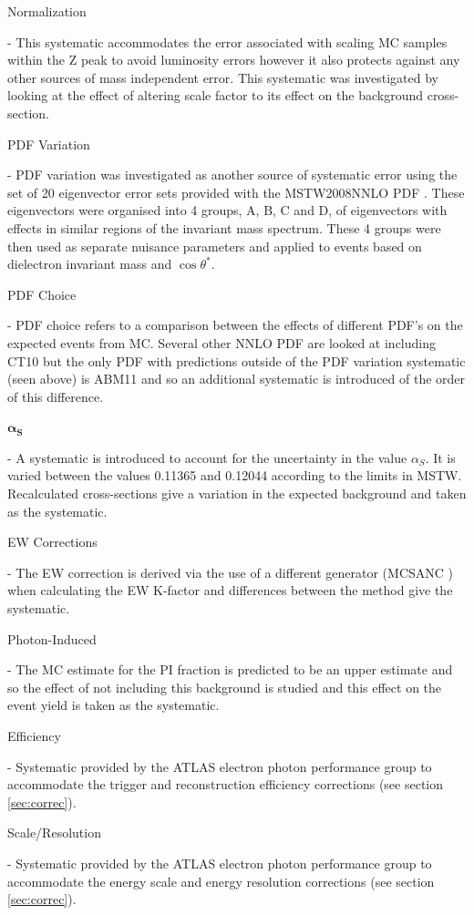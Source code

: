     {\bf\raggedright Normalization} - This systematic accommodates the error associated with scaling MC samples within the Z peak to avoid luminosity errors however it also protects against any other sources of mass independent error. This systematic was investigated by looking at the effect of altering scale factor to its effect on the background cross-section. \\
    {\bf\raggedright PDF Variation} - PDF variation was investigated as another source of systematic error using the set of 20 eigenvector error sets provided with the MSTW2008NNLO PDF \cite{Martin:2009iq}. These eigenvectors were organised into 4 groups, A, B, C and D, of eigenvectors with effects in similar regions of the invariant mass spectrum. These 4 groups were then used as separate nuisance parameters and applied to events based on dielectron invariant mass and $\cos{\theta^{*}}$. \\ 
    {\bf\raggedright PDF Choice} - PDF choice refers to a comparison between the effects of different PDF's on the expected events from MC. Several other NNLO PDF are looked at including CT10 but the only PDF with predictions outside of the PDF variation systematic (seen above) is ABM11 \cite{Alekhin:2013dmy} and so an additional systematic is introduced of the order of this difference. \\
    {\bf\raggedright $\pmb{\alpha_{S}}$} - A systematic is introduced to account for the uncertainty in the value $\alpha_{S}$. It is varied between the values 0.11365 and 0.12044 according to the limits in MSTW. Recalculated cross-sections give a variation in the expected background and taken as the systematic. \\
    {\bf\raggedright EW Corrections} - The EW correction is derived via the use of a different generator (MCSANC \cite{Bondarenko:2013nu}) when calculating the EW K-factor and differences between the method give the systematic. \\
    {\bf\raggedright Photon-Induced} - The MC estimate for the PI fraction is predicted to be an upper estimate and so the effect of not including this background is studied and this effect on the event yield is taken as the systematic. \\
    {\bf\raggedright Efficiency} - Systematic provided by the ATLAS electron photon performance group to accommodate the trigger and reconstruction efficiency corrections (see section \ref{sec:correc}). \\
    {\bf\raggedright Scale/Resolution} - Systematic provided by the ATLAS electron photon performance group to accommodate the energy scale and energy resolution corrections (see section \ref{sec:correc}). \\

